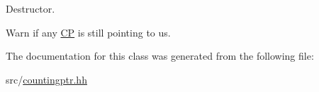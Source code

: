Destructor. 

Warn if any \hyperlink{classhdnum_1_1CP}{CP} is still pointing to us. 

The documentation for this class was generated from the following file:\begin{DoxyCompactItemize}
\item 
src/\hyperlink{countingptr_8hh}{countingptr.hh}\end{DoxyCompactItemize}
